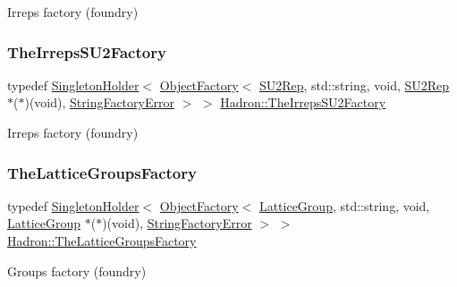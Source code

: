 Irreps factory (foundry) 

\mbox{\label{namespaceHadron_a48c24ae97c1fd9057ed63227b8d89834}} 
\subsubsection{\texorpdfstring{TheIrrepsSU2Factory}{TheIrrepsSU2Factory}}
{\footnotesize\ttfamily typedef \mbox{\hyperlink{classUtil_1_1SingletonHolder}{Singleton\+Holder}}$<$ \mbox{\hyperlink{classUtil_1_1ObjectFactory}{Object\+Factory}}$<$ \mbox{\hyperlink{structHadron_1_1SU2Rep}{S\+U2\+Rep}}, std\+::string, void, \mbox{\hyperlink{structHadron_1_1SU2Rep}{S\+U2\+Rep}} $\ast$($\ast$)(void), \mbox{\hyperlink{structUtil_1_1StringFactoryError}{String\+Factory\+Error}} $>$ $>$ \mbox{\hyperlink{namespaceHadron_a48c24ae97c1fd9057ed63227b8d89834}{Hadron\+::\+The\+Irreps\+S\+U2\+Factory}}}



Irreps factory (foundry) 

\mbox{\label{namespaceHadron_a02f5300bae0fd0f2966756ba9c021b49}} 
\subsubsection{\texorpdfstring{TheLatticeGroupsFactory}{TheLatticeGroupsFactory}}
{\footnotesize\ttfamily typedef \mbox{\hyperlink{classUtil_1_1SingletonHolder}{Singleton\+Holder}}$<$ \mbox{\hyperlink{classUtil_1_1ObjectFactory}{Object\+Factory}}$<$ \mbox{\hyperlink{structHadron_1_1LatticeGroup}{Lattice\+Group}}, std\+::string, void, \mbox{\hyperlink{structHadron_1_1LatticeGroup}{Lattice\+Group}} $\ast$($\ast$)(void), \mbox{\hyperlink{structUtil_1_1StringFactoryError}{String\+Factory\+Error}} $>$ $>$ \mbox{\hyperlink{namespaceHadron_a02f5300bae0fd0f2966756ba9c021b49}{Hadron\+::\+The\+Lattice\+Groups\+Factory}}}



Groups factory (foundry) 

\mbox{\label{namespaceHadron_a48cb722d69c0afc5a2ebda0eaf6fea13}} 
